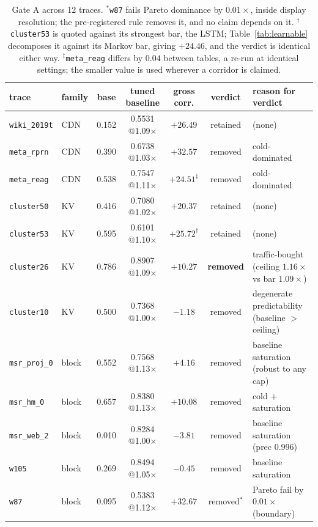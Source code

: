 \documentclass[letterpaper]{article} %
\newcommand{\x}{$\times$}
\begin{document}
\begin{table}[t]
\centering\small
\setlength{\tabcolsep}{4.5pt}
\begin{tabular}{llccccp{5.2cm}}
\toprule
trace & family & base & tuned baseline & gross corr. & verdict & reason for verdict \\
\midrule
\texttt{wiki\_2019t} & CDN & 0.152 & 0.5531 @1.09\x & $+26.49$ & retained & (none)  \\
\texttt{meta\_rprn} & CDN & 0.390 & 0.6738 @1.03\x & $+32.57$ & removed &  cold-dominated \\
\texttt{meta\_reag} & CDN & 0.538 & 0.7547 @1.11\x & $+24.51^{\ddagger}$ & removed &  cold-dominated \\
\texttt{cluster50} & KV & 0.416 & 0.7080 @1.02\x & $+20.37$ & retained & (none)  \\
\texttt{cluster53} & KV & 0.595 & 0.6101 @1.10\x & $+25.72^{\dagger}$ & retained & (none)  \\
\texttt{cluster26} & KV & 0.786 & 0.8907 @1.09\x & $+10.27$ & \textbf{removed} & traffic-bought (ceiling $1.16\times$ vs bar $1.09\times$) \\
\texttt{cluster10} & KV & 0.500 & 0.7368 @1.00\x & $-1.18$ & removed & degenerate predictability (baseline $>$ ceiling) \\
\texttt{msr\_proj\_0} & block & 0.552 & 0.7568 @1.13\x & $+4.16$ & removed & baseline saturation (robust to any cap) \\
\texttt{msr\_hm\_0} & block & 0.657 & 0.8380 @1.13\x & $+10.08$ & removed &  cold $+$ saturation \\
\texttt{msr\_web\_2} & block & 0.010 & 0.8284 @1.00\x & $-3.81$ & removed & baseline saturation (prec 0.996) \\
\texttt{w105} & block & 0.269 & 0.8494 @1.05\x & $-0.45$ & removed & baseline saturation \\
\texttt{w87} & block & 0.095 & 0.5383 @1.12\x & $+32.67$ & removed$^{*}$ & Pareto fail by $0.01\times$ (boundary) \\
\bottomrule
\end{tabular}
\caption{Gate A across 12 traces. $^{*}$\texttt{w87} fails Pareto dominance by $0.01\times$, inside display resolution; the pre-registered rule removes it, and no claim depends on it. $^{\dagger}$\texttt{cluster53} is quoted against its strongest bar, the LSTM; Table~\ref{tab:learnable} decomposes it against its Markov bar, giving $+24.46$, and the verdict is identical either way. $^{\ddagger}$\texttt{meta\_reag} differs by $0.04$ between tables, a re-run at identical settings; the smaller value is used wherever a corridor is claimed.}
\label{tab:gatea}
\end{table}
\end{document}
